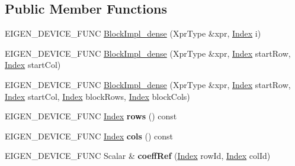 \subsection*{Public Member Functions}
\begin{DoxyCompactItemize}
\item 
E\+I\+G\+E\+N\+\_\+\+D\+E\+V\+I\+C\+E\+\_\+\+F\+U\+NC \hyperlink{class_eigen_1_1internal_1_1_block_impl__dense_af68c0eafb607bb884cfe507bee39052e}{Block\+Impl\+\_\+dense} (Xpr\+Type \&xpr, \hyperlink{namespace_eigen_a62e77e0933482dafde8fe197d9a2cfde}{Index} i)
\item 
E\+I\+G\+E\+N\+\_\+\+D\+E\+V\+I\+C\+E\+\_\+\+F\+U\+NC \hyperlink{class_eigen_1_1internal_1_1_block_impl__dense_aa77daae8d8aef85ce9445cfd23363cbf}{Block\+Impl\+\_\+dense} (Xpr\+Type \&xpr, \hyperlink{namespace_eigen_a62e77e0933482dafde8fe197d9a2cfde}{Index} start\+Row, \hyperlink{namespace_eigen_a62e77e0933482dafde8fe197d9a2cfde}{Index} start\+Col)
\item 
E\+I\+G\+E\+N\+\_\+\+D\+E\+V\+I\+C\+E\+\_\+\+F\+U\+NC \hyperlink{class_eigen_1_1internal_1_1_block_impl__dense_a187c7918e6f200bf1d7d9a9c2f608547}{Block\+Impl\+\_\+dense} (Xpr\+Type \&xpr, \hyperlink{namespace_eigen_a62e77e0933482dafde8fe197d9a2cfde}{Index} start\+Row, \hyperlink{namespace_eigen_a62e77e0933482dafde8fe197d9a2cfde}{Index} start\+Col, \hyperlink{namespace_eigen_a62e77e0933482dafde8fe197d9a2cfde}{Index} block\+Rows, \hyperlink{namespace_eigen_a62e77e0933482dafde8fe197d9a2cfde}{Index} block\+Cols)
\item 
\mbox{\label{class_eigen_1_1internal_1_1_block_impl__dense_a233bff1b2ba038272ba57891802c9b30}} 
E\+I\+G\+E\+N\+\_\+\+D\+E\+V\+I\+C\+E\+\_\+\+F\+U\+NC \hyperlink{namespace_eigen_a62e77e0933482dafde8fe197d9a2cfde}{Index} {\bfseries rows} () const
\item 
\mbox{\label{class_eigen_1_1internal_1_1_block_impl__dense_ad9029a68d176acb67683ad387343a318}} 
E\+I\+G\+E\+N\+\_\+\+D\+E\+V\+I\+C\+E\+\_\+\+F\+U\+NC \hyperlink{namespace_eigen_a62e77e0933482dafde8fe197d9a2cfde}{Index} {\bfseries cols} () const
\item 
\mbox{\label{class_eigen_1_1internal_1_1_block_impl__dense_a1e50e8322ff5af7141c45eacbeaf86cd}} 
E\+I\+G\+E\+N\+\_\+\+D\+E\+V\+I\+C\+E\+\_\+\+F\+U\+NC Scalar \& {\bfseries coeff\+Ref} (\hyperlink{namespace_eigen_a62e77e0933482dafde8fe197d9a2cfde}{Index} row\+Id, \hyperlink{namespace_eigen_a62e77e0933482dafde8fe197d9a2cfde}{Index} col\+Id)

\end{DoxyCompactItemize}
